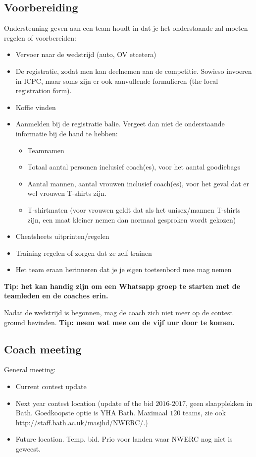 	\subsection{Voorbereiding}
	Ondersteuning geven aan een team houdt in dat je het onderstaande zal moeten regelen of voorbereiden:
	\begin{itemize}
	\item Vervoer naar de wedstrijd (auto, OV etcetera)
	\item De registratie, zodat men kan deelnemen aan de competitie. Sowieso invoeren in ICPC, maar soms zijn er ook aanvullende formulieren (the local registration form).
	\item Koffie vinden
	\item Aanmelden bij de registratie balie. Vergeet dan niet de onderstaande informatie bij de hand te hebben:
		\begin{itemize}
		\item 	Teamnamen
		\item 	Totaal aantal personen inclusief coach(es), voor het aantal goodiebags
		\item 	Aantal mannen, aantal vrouwen inclusief coach(es), voor het geval dat er wel vrouwen T-shirts zijn.
		\item 	T-shirtmaten (voor vrouwen geldt dat als het unisex/mannen T-shirts zijn, een maat kleiner nemen dan normaal gesproken wordt gekozen)
		\end{itemize}
	\item Cheatsheets uitprinten/regelen
	\item Training regelen of zorgen dat ze zelf trainen
	\item Het team eraan herinneren dat je je eigen toetsenbord mee mag nemen
	\end{itemize}
	\textbf{Tip: het kan handig zijn om een Whatsapp groep te starten met de teamleden en de coaches erin.}

	Nadat de wedstrijd is begonnen, mag de coach zich niet meer op de contest ground bevinden. \textbf{Tip: neem wat mee om de vijf uur door te komen.}
	
	\subsection{Coach meeting}\label{CoachMeeting}
	General meeting:
	\begin{itemize}
	\item Current contest update
	\item Next year contest location (update of the bid $2016$-$2017$, geen slaapplekken in Bath. Goedkoopste optie is YHA Bath. Maximaal $120$ teams, zie ook http://staff.bath.ac.uk/masjhd/NWERC/.)
	\item Future location. Temp. bid. Prio voor landen waar NWERC nog niet is geweest.
	\end{itemize}		
	
